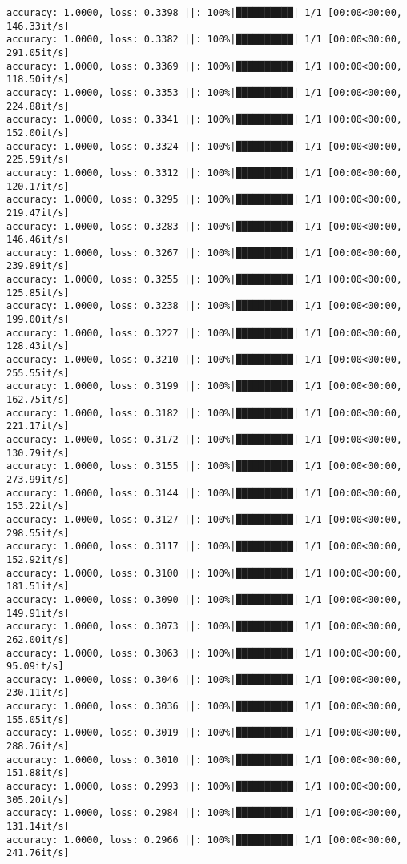 \documentclass[
]{article}
\begin{document}
\begin{verbatim}
accuracy: 1.0000, loss: 0.3398 ||: 100%|██████████| 1/1 [00:00<00:00, 146.33it/s]
accuracy: 1.0000, loss: 0.3382 ||: 100%|██████████| 1/1 [00:00<00:00, 291.05it/s]
accuracy: 1.0000, loss: 0.3369 ||: 100%|██████████| 1/1 [00:00<00:00, 118.50it/s]
accuracy: 1.0000, loss: 0.3353 ||: 100%|██████████| 1/1 [00:00<00:00, 224.88it/s]
accuracy: 1.0000, loss: 0.3341 ||: 100%|██████████| 1/1 [00:00<00:00, 152.00it/s]
accuracy: 1.0000, loss: 0.3324 ||: 100%|██████████| 1/1 [00:00<00:00, 225.59it/s]
accuracy: 1.0000, loss: 0.3312 ||: 100%|██████████| 1/1 [00:00<00:00, 120.17it/s]
accuracy: 1.0000, loss: 0.3295 ||: 100%|██████████| 1/1 [00:00<00:00, 219.47it/s]
accuracy: 1.0000, loss: 0.3283 ||: 100%|██████████| 1/1 [00:00<00:00, 146.46it/s]
accuracy: 1.0000, loss: 0.3267 ||: 100%|██████████| 1/1 [00:00<00:00, 239.89it/s]
accuracy: 1.0000, loss: 0.3255 ||: 100%|██████████| 1/1 [00:00<00:00, 125.85it/s]
accuracy: 1.0000, loss: 0.3238 ||: 100%|██████████| 1/1 [00:00<00:00, 199.00it/s]
accuracy: 1.0000, loss: 0.3227 ||: 100%|██████████| 1/1 [00:00<00:00, 128.43it/s]
accuracy: 1.0000, loss: 0.3210 ||: 100%|██████████| 1/1 [00:00<00:00, 255.55it/s]
accuracy: 1.0000, loss: 0.3199 ||: 100%|██████████| 1/1 [00:00<00:00, 162.75it/s]
accuracy: 1.0000, loss: 0.3182 ||: 100%|██████████| 1/1 [00:00<00:00, 221.17it/s]
accuracy: 1.0000, loss: 0.3172 ||: 100%|██████████| 1/1 [00:00<00:00, 130.79it/s]
accuracy: 1.0000, loss: 0.3155 ||: 100%|██████████| 1/1 [00:00<00:00, 273.99it/s]
accuracy: 1.0000, loss: 0.3144 ||: 100%|██████████| 1/1 [00:00<00:00, 153.22it/s]
accuracy: 1.0000, loss: 0.3127 ||: 100%|██████████| 1/1 [00:00<00:00, 298.55it/s]
accuracy: 1.0000, loss: 0.3117 ||: 100%|██████████| 1/1 [00:00<00:00, 152.92it/s]
accuracy: 1.0000, loss: 0.3100 ||: 100%|██████████| 1/1 [00:00<00:00, 181.51it/s]
accuracy: 1.0000, loss: 0.3090 ||: 100%|██████████| 1/1 [00:00<00:00, 149.91it/s]
accuracy: 1.0000, loss: 0.3073 ||: 100%|██████████| 1/1 [00:00<00:00, 262.00it/s]
accuracy: 1.0000, loss: 0.3063 ||: 100%|██████████| 1/1 [00:00<00:00, 95.09it/s]
accuracy: 1.0000, loss: 0.3046 ||: 100%|██████████| 1/1 [00:00<00:00, 230.11it/s]
accuracy: 1.0000, loss: 0.3036 ||: 100%|██████████| 1/1 [00:00<00:00, 155.05it/s]
accuracy: 1.0000, loss: 0.3019 ||: 100%|██████████| 1/1 [00:00<00:00, 288.76it/s]
accuracy: 1.0000, loss: 0.3010 ||: 100%|██████████| 1/1 [00:00<00:00, 151.88it/s]
accuracy: 1.0000, loss: 0.2993 ||: 100%|██████████| 1/1 [00:00<00:00, 305.20it/s]
accuracy: 1.0000, loss: 0.2984 ||: 100%|██████████| 1/1 [00:00<00:00, 131.14it/s]
accuracy: 1.0000, loss: 0.2966 ||: 100%|██████████| 1/1 [00:00<00:00, 241.76it/s]

\end{verbatim}
\end{document}
